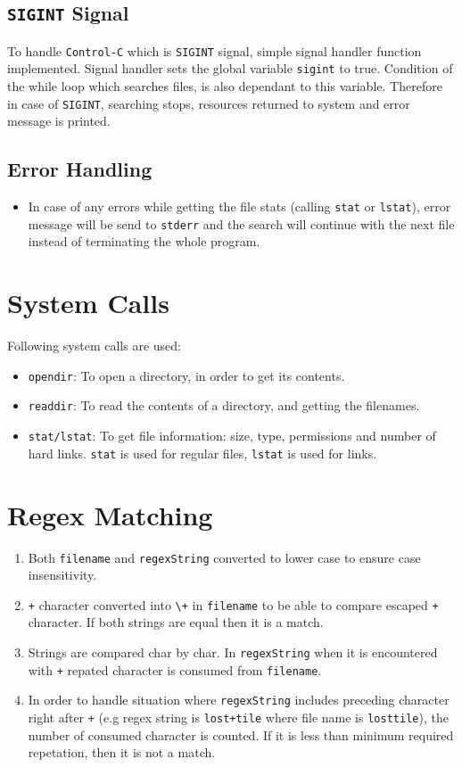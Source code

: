 \documentclass[a4paper]{article}
\begin{document}
\subsection{\texttt{SIGINT} Signal}
To handle \texttt{Control-C} which is \texttt{SIGINT} signal, simple signal handler function implemented. Signal handler sets the global variable \texttt{sigint} to true. Condition of the while loop which searches files, is also dependant to this variable. Therefore in case of \texttt{SIGINT}, searching stops, resources returned to system and error message is printed.

\subsection{Error Handling}

\begin{itemize}
\item In case of any errors while getting the file stats (calling \texttt{stat} or \texttt{lstat}), error message will be send to \texttt{stderr} and the search will continue with the next file instead of terminating the whole program.
\end{itemize}

\section{System Calls}
Following system calls are used:
\begin{itemize}
\item \texttt{opendir}: To open a directory, in order to get its contents.
\item \texttt{readdir}: To read the contents of a directory, and getting the filenames.
\item \texttt{stat/lstat}: To get file information: size, type, permissions and number of hard links. \texttt{stat} is used for regular files, \texttt{lstat} is used for links.
\end{itemize}

\section{Regex Matching}
\begin{enumerate}
\item Both \texttt{filename} and \texttt{regexString} converted to lower case to ensure case insensitivity.
\item \texttt{+} character converted into \texttt{\textbackslash{}+} in \texttt{filename} to be able to compare escaped \texttt{+} character. If both strings are equal then it is a match.
\item Strings are compared char by char. In \texttt{regexString} when it is encountered with \texttt{+} repated character is consumed from \texttt{filename}.
\item In order to handle situation where \texttt{regexString} includes preceding character right after \texttt{+} (e.g regex string is \texttt{lost+tile} where file name is \texttt{losttile}), the number of consumed character is counted. If it is less than minimum required repetation, then it is not a match.
\end{enumerate}
\end{document}
